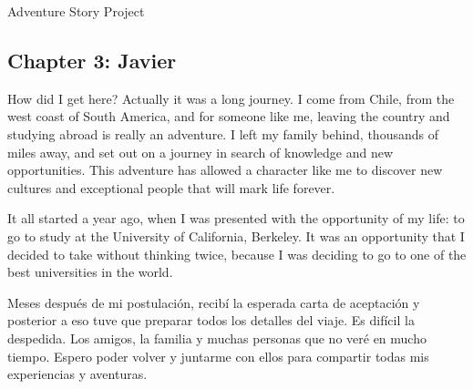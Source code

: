 \documentclass{article}
\begin{document}
\Huge Adventure Story Project

\normalsize

\subsection*{Chapter 3: Javier}

How did I get here? Actually it was a long journey. I come from Chile, from the west coast of South America, and for someone like me, leaving the country and studying abroad is really an adventure. I left my family behind, thousands of miles away, and set out on a journey in search of knowledge and new opportunities. This adventure has allowed a character like me to discover new cultures and exceptional people that will mark life forever.

It all started a year ago, when I was presented with the opportunity of my life: to go to study at the University of California, Berkeley. It was an opportunity that I decided to take without thinking twice, because I was deciding to go to one of the best universities in the world.

Meses después de mi postulación, recibí la esperada carta de aceptación y posterior a eso tuve que preparar todos los detalles del viaje. Es difícil la despedida. Los amigos, la familia y muchas personas que no veré en mucho tiempo. Espero poder volver y juntarme con ellos para compartir todas mis experiencias y aventuras.
\end{document}
